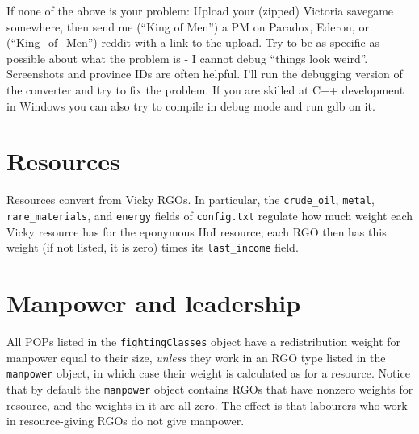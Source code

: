 \documentclass[12pt,ebook,oneside]{book}
\begin{document}
If none of the above is your problem: Upload your (zipped) Victoria
savegame somewhere, then send me (``King of Men'') a PM on Paradox,
Ederon, or (``King\_of\_Men'') reddit with a link to the upload. Try to be as
specific as possible about what the problem is - I cannot debug
``things look weird''. Screenshots and province IDs are often
helpful. I'll run the
debugging version of the converter and try to fix the
problem. If you are skilled at C++ development in Windows you can also
try to compile in debug mode and run gdb on it. 


\section{Resources}

Resources convert from Vicky RGOs. In particular, the
\texttt{crude\_oil}, \texttt{metal}, \texttt{rare\_materials}, and
\texttt{energy} fields of \texttt{config.txt} regulate how much weight
each Vicky resource has for the eponymous HoI resource; each RGO then
has this weight (if not listed, it is zero) times its
\texttt{last\_income} field. 

\section{Manpower and leadership}

All POPs listed in the \texttt{fightingClasses} object have a
redistribution weight for manpower equal to their size, \emph{unless}
they work in an RGO type listed in the \texttt{manpower} object, in
which case their weight is calculated as for a resource. Notice that
by default the \texttt{manpower} object contains RGOs that have
nonzero weights for resource, and the weights in it are all zero. The
effect is that labourers who work in resource-giving RGOs do not give
manpower. 
\end{document}
